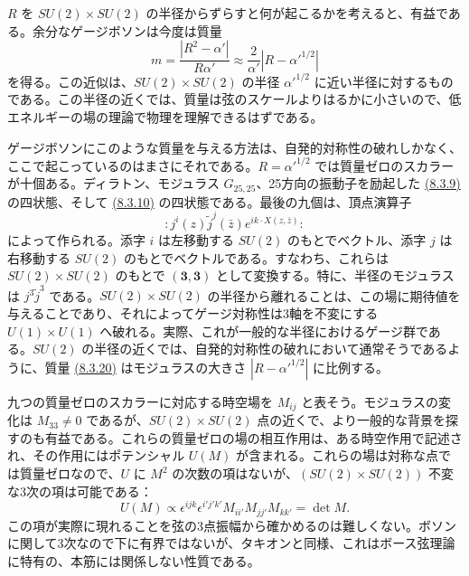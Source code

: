 
$R$ を $SU(2)\times SU(2)$ の半径からずらすと何が起こるかを考えると、有益である。余分なゲージボソンは今度は質量
\begin{equation}
m=\frac{|R^2-\alpha'|}{R\alpha'}\approx\frac2{\alpha'}\left|R-\alpha'^{1/2}\right|
\tag{8.3.20}\label{eq:8.3.20}
\end{equation}
を得る。この近似は、$SU(2)\times SU(2)$ の半径 $\alpha'^{1/2}$ に近い半径に対するものである。この半径の近くでは、質量は弦のスケールよりはるかに小さいので、低エネルギーの場の理論で物理を理解できるはずである。

ゲージボソンにこのような質量を与える方法は、自発的対称性の破れしかなく、ここで起こっているのはまさにそれである。$R=\alpha'^{1/2}$ では質量ゼロのスカラーが十個ある。ディラトン、モジュラス $G_{25,25}$、25方向の振動子を励起した \hyperref[eq:8.3.9]{(8.3.9)} の四状態、そして \hyperref[eq:8.3.10]{(8.3.10)} の四状態である。最後の九個は、頂点演算子
\begin{equation}
:j^i(z)\widetilde j^j(\bar z)e^{ik\cdot X(z,\bar z)}:
\tag{8.3.21}\label{eq:8.3.21}
\end{equation}
によって作られる。添字 $i$ は左移動する $SU(2)$ のもとでベクトル、添字 $j$ は右移動する $SU(2)$ のもとでベクトルである。すなわち、これらは $SU(2)\times SU(2)$ のもとで $(\mathbf3,\mathbf3)$ として変換する。特に、半径のモジュラスは $j^3\widetilde j^3$ である。$SU(2)\times SU(2)$ の半径から離れることは、この場に期待値を与えることであり、それによってゲージ対称性は3軸を不変にする $U(1)\times U(1)$ へ破れる。実際、これが一般的な半径におけるゲージ群である。$SU(2)$ の半径の近くでは、自発的対称性の破れにおいて通常そうであるように、質量 \hyperref[eq:8.3.20]{(8.3.20)} はモジュラスの大きさ $|R-\alpha'^{1/2}|$ に比例する。

九つの質量ゼロのスカラーに対応する時空場を $M_{ij}$ と表そう。モジュラスの変化は $M_{33}\ne0$ であるが、$SU(2)\times SU(2)$ 点の近くで、より一般的な背景を探すのも有益である。これらの質量ゼロの場の相互作用は、ある時空作用で記述され、その作用にはポテンシャル $U(M)$ が含まれる。これらの場は対称な点では質量ゼロなので、$U$ に $M^2$ の次数の項はないが、$(SU(2)\times SU(2))$ 不変な3次の項は可能である：
\begin{equation}
U(M)\propto\epsilon^{ijk}\epsilon^{i'j'k'}M_{ii'}M_{jj'}M_{kk'}=\det M.
\tag{8.3.22}\label{eq:8.3.22}
\end{equation}
この項が実際に現れることを弦の3点振幅から確かめるのは難しくない。ボソンに関して3次なので下に有界ではないが、タキオンと同様、これはボース弦理論に特有の、本筋には関係しない性質である。

